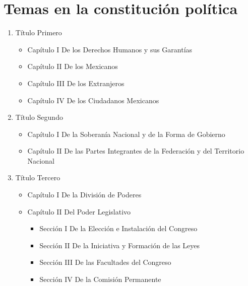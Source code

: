 \documentclass[12pt]{article}
\begin{document}
	\section{Temas en la constitución política}
	\label{appendix:temasCPEUM}
		\begin{enumerate}
			\item Título Primero 
				\begin{itemize}
					\item Capítulo I De los Derechos Humanos y sus Garantías
					
					\item Capítulo II De los Mexicanos
					
					\item Capítulo III De los Extranjeros
					
					\item Capítulo IV De los Ciudadanos Mexicanos
				\end{itemize}
			
			
			\item Título Segundo 
				\begin{itemize}
					\item Capítulo I De la Soberanía Nacional y de la Forma de Gobierno
								
					\item Capítulo II De las Partes Integrantes de la Federación y del Territorio Nacional
				\end{itemize}
			
			\item Título Tercero
			
				\begin{itemize}
					\item Capítulo I De la División de Poderes
					
					\item Capítulo II Del Poder Legislativo
					
						\begin{itemize}										
							\item Sección I De la Elección e Instalación del Congreso
							
							\item Sección II De la Iniciativa y Formación de las Leyes
							
							\item Sección III De las Facultades del Congreso
							
							\item Sección IV De la Comisión Permanente
							

\end{itemize}
\end{itemize}
\end{enumerate}
\end{document}
